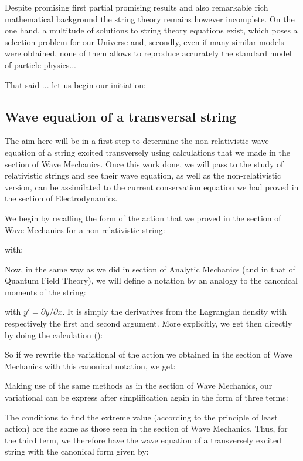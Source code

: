 	Despite promising first partial promising results and also remarkable rich mathematical background the string theory remains however incomplete. On the one hand, a multitude of solutions to string theory equations exist, which poses a selection problem for our Universe and, secondly, even if many similar models were obtained, none of them allows to reproduce accurately the standard model of particle physics...
	
	That said ... let us begin our initiation:
	
	\subsection{Wave equation of a transversal string}
	The aim here will be in a first step to determine the non-relativistic wave equation of a string excited transversely using calculations that we made in the section of Wave Mechanics. Once this work done, we will pass to the study of relativistic strings and see their wave equation, as well as the non-relativistic version, can be assimilated to the current conservation equation we had proved in the section of Electrodynamics.
	
	We begin by recalling the form of the action that we proved in the section of Wave Mechanics for a non-relativistic string:
	
	with:
	
	Now, in the same way as we did in section of Analytic Mechanics (and in that of Quantum Field Theory), we will define a notation by an analogy to the canonical moments of the string:
	
	with $y'=\partial y/\partial x$. It is simply the derivatives from the Lagrangian density with respectively the first and second argument. More explicitly, we get then directly by doing the calculation ():
	
	So if we rewrite the variational of the action we obtained in the section of Wave Mechanics with this canonical notation, we get:
	
	Making use of the same methods as in the section of Wave Mechanics, our variational can be express after simplification again in the form of three terms:
	
	The conditions to find the extreme value (according to the principle of least action) are the same as those seen in the section of Wave Mechanics. Thus, for the third term, we therefore have the wave equation of a transversely excited string with the canonical form given by:
	
